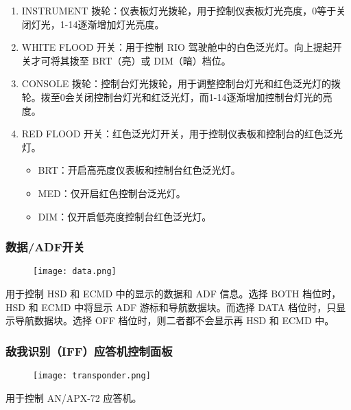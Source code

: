 \begin{enumerate}
	\item INSTRUMENT 拨轮：仪表板灯光拨轮，用于控制仪表板灯光亮度，0等于关闭灯光，1-14逐渐增加灯光亮度。
	\item WHITE FLOOD 开关：用于控制 RIO 驾驶舱中的白色泛光灯。向上提起开关才可将其拨至 BRT（亮）或 DIM（暗）档位。
	\item CONSOLE 拨轮：控制台灯光拨轮，用于调整控制台灯光和红色泛光灯的拨轮。拨至0会关闭控制台灯光和红泛光灯，而1-14逐渐增加控制台灯光的亮度。
	\item RED FLOOD 开关：红色泛光灯开关，用于控制仪表板和控制台的红色泛光灯。
	      \begin{itemize}
		      \item BRT：开启高亮度仪表板和控制台红色泛光灯。
		      \item MED：仅开启红色控制台泛光灯。
		      \item DIM：仅开启低亮度控制台红色泛光灯。
	      \end{itemize}
\end{enumerate}

\subsubsection{数据/ADF开关}
\begin{figure}[htb]
	\centering
	\texttt{[image: data.png]}
\end{figure}
用于控制 HSD 和 ECMD 中的显示的数据和 ADF 信息。选择 BOTH 档位时，HSD 和 ECMD 中将显示 ADF 游标和导航数据块。而选择 DATA 档位时，只显示导航数据块。选择 OFF 档位时，则二者都不会显示再 HSD 和 ECMD 中。

\subsubsection{敌我识别（IFF）应答机控制面板}
\begin{figure}[htb]
	\centering
	\texttt{[image: transponder.png]}
\end{figure}
用于控制 AN/APX-72 应答机。

